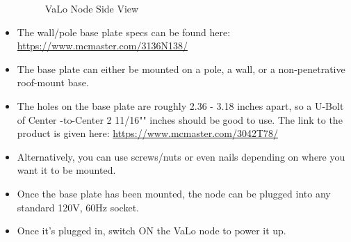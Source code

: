 \documentclass[12pt]{article}
\begin{document}
\begin{itemize}
\begin{figure}[H]
     \centering
    \caption{VaLo Node Side View}\label{Fig:VaLo Node_2}
\end{figure}
\item  The wall/pole base plate specs can be found here: \url{https://www.mcmaster.com/3136N138/}
\item The base plate can either be mounted on a pole, a wall, or a non-penetrative roof-mount base.
\item The holes on the base  plate are roughly 2.36 - 3.18 inches apart, so a U-Bolt of Center -to-Center	2 11/16"" inches should be good to use. The link to the product is given here:
\url{https://www.mcmaster.com/3042T78/}
\item Alternatively, you can use  screws/nuts or even nails depending on where you want it to be mounted.
\item Once the base plate has been mounted, the node can be plugged into any standard 120V, 60Hz socket.
\item Once it's plugged in, switch ON the VaLo node to power it up.
\end{itemize}
\end{document}
